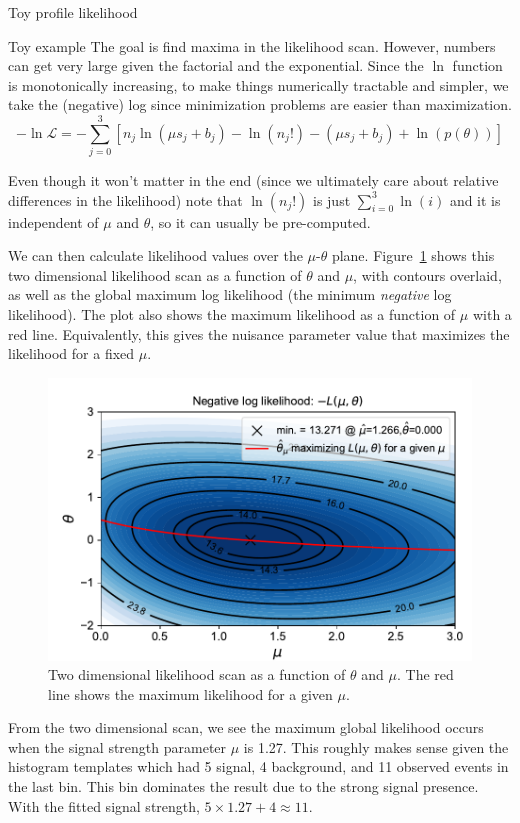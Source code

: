\begin{section}{Toy profile likelihood}
\begin{subsection}{Toy example}
The goal is find maxima in the likelihood scan. However, numbers can get very
large given the factorial and the exponential. Since the $\ln$
function is monotonically increasing, to make things numerically
tractable and simpler, we take the (negative) log
since minimization problems are easier than maximization. 
\begin{equation}
-\ln\mathcal{L}=-\sum_{j=0}^{3}\left[
n_j \ln(\mu s_j + b_j) - \ln(n_j!) - (\mu s_j + b_j) + \ln(p(\theta))
\right]
\end{equation}


Even though it won't matter in the end (since we ultimately care about
relative differences in the likelihood) note that $\ln(n_j!)$ is just
$\sum_{i=0}^{3}\ln(i)$ and it is independent of $\mu$ and
$\theta$, so it can usually be pre-computed.

We can then calculate likelihood values over the $\mu$-$\theta$ plane. 
Figure~\ref{fig:toystat:2dlikelihood} shows this two dimensional
likelihood scan as a function of $\theta$ and $\mu$, with contours overlaid,
as well as the global maximum log likelihood (the
minimum \emph{negative} log likelihood).
The plot also shows the maximum likelihood as a function of $\mu$
with a red line. Equivalently, this gives the nuisance parameter value that
maximizes the likelihood for a fixed $\mu$.

\begin{figure}[!htb]
    \centering
    \includegraphics[width=0.80\linewidth]{figs/toy_statistics/likelihood_theta_vs_mu.pdf}
    \caption{
Two dimensional likelihood scan as a function of $\theta$ and $\mu$. The red line
shows the maximum likelihood for a given $\mu$.
    }
    \label{fig:toystat:2dlikelihood}
\end{figure}
    
From the two dimensional scan, we see the maximum global likelihood 
occurs when the signal strength parameter
$\mu$ is 1.27. This roughly makes sense given the histogram templates which had
5 signal, 4 background, and 11 observed events in the last bin.
This bin dominates the result due to the strong signal presence.
With the fitted signal strength, $5\times1.27 + 4 \approx 11$.


\end{subsection}
\end{section}

